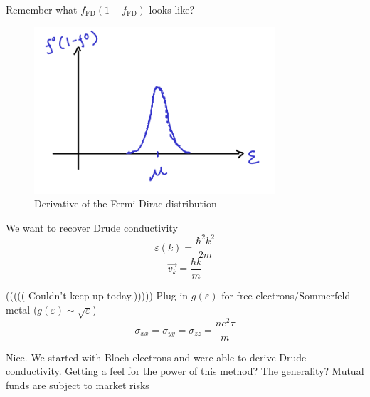 \documentclass[a4paper]{article}
\newcommand{\hcut}{\hbar}
\begin{document}
Remember what $f_{\text{FD}}\left( 1 - f_{\text{FD}} \right) $ looks like?
\begin{figure}[h]
	\centering
	\includegraphics[width=0.8\textwidth]{figures/fddv.png}
	\caption{Derivative of the Fermi-Dirac distribution}
	\label{fig:figures-fddv-png}
\end{figure}


We want to recover Drude conductivity
\begin{equation}
	\varepsilon(k) = \frac{\hcut^2k^2}{2m}
\end{equation}
\begin{equation}
	\vec{v_k} = \frac{\hcut k}{m}
\end{equation}
%

((((( Couldn't keep up today.)))))
Plug in $g(\varepsilon)$ for free electrons/Sommerfeld metal ($g(\varepsilon) \sim \sqrt{\varepsilon} $)
\begin{equation}
	\sigma_{xx} = \sigma_{y y} = \sigma_{z z} = \frac{ne^2\tau}{m}
\end{equation}

Nice. We started with Bloch electrons and were able to derive Drude
conductivity. Getting a feel for the power of this method? The generality?
Mutual funds are subject to market risks
\end{document}
